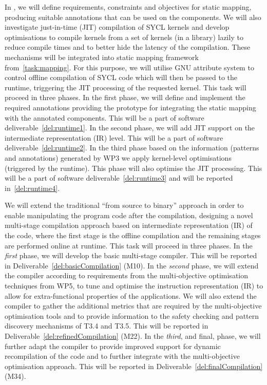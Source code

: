 \begin{Workpackage}{\thewpno}
\begin{Task}

\TaskResults{
\ref{del:runtime1}
\ref{del:runtime2}
\ref{del:runtime3}
\ref{del:runtime4}
}
\TaskHeader{}
In \theTask, we will define requirements, constraints  and objectives for static mapping, producing suitable annotations that can be used on the components. We will also investigate just-in-time (JIT) compilation of SYCL kernels and develop optimisations to compile kernels from a set of kernels (in a library) lazily to reduce compile times and to better hide the latency of the compilation. These mechanisms will be integrated into static mapping framework from~\ref{task:mapping}. For this purpose, we will utilise GNU attribute system to control offline compilation of SYCL code which will then be passed to the runtime, triggering the JIT processing of the requested kernel. This task will proceed in three phases. In the first phase, we will define and implement the required annotations providing the prototype for integrating the static mapping with the annotated components. This will be a part of software deliverable~\ref{del:runtime1}.
In the second phase, we will add JIT support on the intermediate representation (IR) level. This will be a part of software deliverable~\ref{del:runtime2}.
In the third phase based on the information (patterns and annotations) generated by WP3 we apply kernel-level optimisations (triggered by the runtime). This phase will also optimise the JIT processing. This will be a part of software deliverable~\ref{del:runtime3} and will be reported in~\ref{del:runtime4}.

 {
We will extend the traditional
``from source to binary'' approach in order to enable manipulating the
program code after the compilation, designing a novel multi-stage compilation approach
based on intermediate representation (IR) of the code,
where the first stage is the offline compilation and the remaining stages are performed
online at runtime.
%
This task will proceed in three phases. In the \emph{first} phase, we will develop
the basic multi-stage compiler. This will be reported in  Deliverable~\ref{del:basicCompilation} (M10). In the
\emph{second} phase, we will extend the compiler according to requirements
from the multi-objective optimisation techniques from WP5, to tune and optimise the
instruction representation (IR) to allow for extra-functional properties of the applications. We will also extend the compiler
to gather the additional metrics that are required by the multi-objective optimisation tools and
to provide information to the safety checking and pattern discovery mechanisms
of T3.4 and T3.5. This will be reported in  Deliverable~\ref{del:refinedCompilation} (M22). In the \emph{third}, and final, phase,
we will further adapt the compiler to provide improved support for dynamic recompilation
of the code and to further integrate with the multi-objective optimisation approach. This
will be reported in Deliverable~\ref{del:finalCompilation} (M34).
}
\end{Task}


\end{Workpackage}
